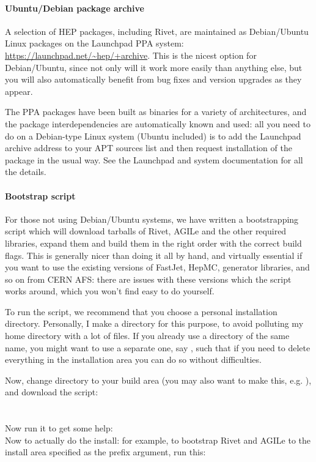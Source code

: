 \paragraph{Ubuntu/Debian package archive}

A selection of HEP packages, including Rivet, are maintained as Debian/Ubuntu
Linux packages on the Launchpad PPA system:
\url{https://launchpad.net/~hep/+archive}. This is the nicest option for
Debian/Ubuntu, since not only will it work more easily than anything else, but
you will also automatically benefit from bug fixes and version upgrades as they
appear.

The PPA packages have been built as binaries for a variety of architectures, and
the package interdependencies are automatically known and used: all you need to
do on a Debian-type Linux system (Ubuntu included) is to add the Launchpad
archive address to your APT sources list and then request installation of the
 package in the usual way. See the Launchpad and system documentation
for all the details.


\paragraph{Bootstrap script}

For those not using Debian/Ubuntu systems, we have written a bootstrapping
script which will download tarballs of Rivet, AGILe and the other required
libraries, expand them and build them in the right order with the correct build
flags. This is generally nicer than doing it all by hand, and virtually
essential if you want to use the existing versions of FastJet, HepMC, generator
libraries, and so on from CERN AFS: there are issues with these versions which
the script works around, which you won't find easy to do yourself.

To run the script, we recommend that you choose a personal installation
directory. Personally, I make a  directory for this purpose, to
avoid polluting my home directory with a lot of files. If you already use a
directory of the same name, you might want to use a separate one, say
, such that if you need to delete everything in the
installation area you can do so without difficulties.

Now, change directory to your build area (you may also want to make this,
e.g. ), and download the script:\\
\\
\\
Now run it to get some help:
\\
Now to actually do the install: for example, to bootstrap Rivet and AGILe
to the install area specified as the prefix argument, run this:\\


